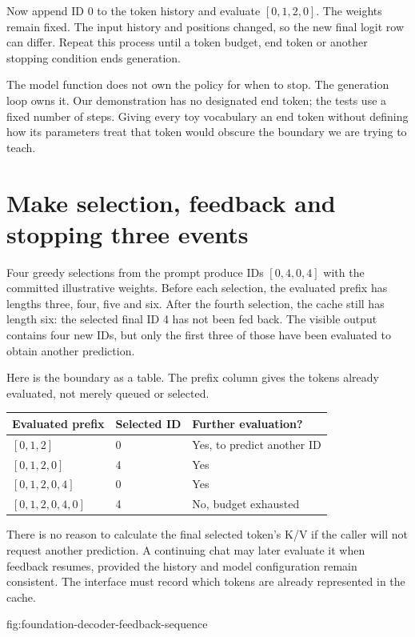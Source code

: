 Now append ID 0 to the token history and evaluate $[0,1,2,0]$. The
weights remain fixed. The input history and positions changed, so the
new final logit row can differ. Repeat this process until a token budget,
end token or another stopping condition ends generation.

The model function does not own the policy for when to stop. The
generation loop owns it. Our demonstration has no designated end token;
the tests use a fixed number of steps. Giving every toy vocabulary an
end token without defining how its parameters treat that token would
obscure the boundary we are trying to teach.

\section{Make selection, feedback and stopping three events}
Four greedy selections from the prompt produce IDs $[0,4,0,4]$ with
the committed illustrative weights. Before each selection, the evaluated
prefix has lengths three, four, five and six. After the fourth selection,
the cache still has length six: the selected final ID 4 has not been
fed back. The visible output contains four new IDs, but only the first
three of those have been evaluated to obtain another prediction.

Here is the boundary as a table. The prefix column gives the tokens
already evaluated, not merely queued or selected.
\begin{center}
\begin{tabular}{@{}lll@{}}
\toprule
Evaluated prefix & Selected ID & Further evaluation?\\
\midrule
$[0,1,2]$ & 0 & Yes, to predict another ID\\
$[0,1,2,0]$ & 4 & Yes\\
$[0,1,2,0,4]$ & 0 & Yes\\
$[0,1,2,0,4,0]$ & 4 & No, budget exhausted\\
\bottomrule
\end{tabular}
\end{center}
There is no reason to calculate the final selected token's K/V if the
caller will not request another prediction. A continuing chat may later
evaluate it when feedback resumes, provided the history and model
configuration remain consistent. The interface must record which tokens
are already represented in the cache.

{fig:foundation-decoder-feedback-sequence}

